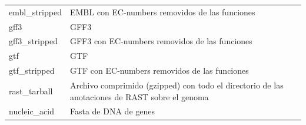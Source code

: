 \documentclass[12pt,twoside]{reedthesis}
\begin{document}
\begin{longtable}[]{@{}ll@{}}
\begin{minipage}[t]{0.22\columnwidth}
  embl\_stripped\strut
  \end{minipage} & \begin{minipage}[t]{0.72\columnwidth}\raggedright\strut
  EMBL con EC-numbers removidos de las funciones\strut
  \end{minipage}\tabularnewline
  \begin{minipage}[t]{0.22\columnwidth}\raggedright\strut
  gff3\strut
  \end{minipage} & \begin{minipage}[t]{0.72\columnwidth}\raggedright\strut
  GFF3\strut
  \end{minipage}\tabularnewline
  \begin{minipage}[t]{0.22\columnwidth}\raggedright\strut
  gff3\_stripped\strut
  \end{minipage} & \begin{minipage}[t]{0.72\columnwidth}\raggedright\strut
  GFF3 con EC-numbers removidos de las funciones\strut
  \end{minipage}\tabularnewline
  \begin{minipage}[t]{0.22\columnwidth}\raggedright\strut
  gtf\strut
  \end{minipage} & \begin{minipage}[t]{0.72\columnwidth}\raggedright\strut
  GTF\strut
  \end{minipage}\tabularnewline
  \begin{minipage}[t]{0.22\columnwidth}\raggedright\strut
  gtf\_stripped\strut
  \end{minipage} & \begin{minipage}[t]{0.72\columnwidth}\raggedright\strut
  GTF con EC-numbers removidos de las funciones\strut
  \end{minipage}\tabularnewline
  \begin{minipage}[t]{0.22\columnwidth}\raggedright\strut
  rast\_tarball\strut
  \end{minipage} & \begin{minipage}[t]{0.72\columnwidth}\raggedright\strut
  Archivo comprimido (gzipped) con todo el directorio de las anotaciones
  de RAST sobre el genoma\strut
  \end{minipage}\tabularnewline
  \begin{minipage}[t]{0.22\columnwidth}\raggedright\strut
  nucleic\_acid\strut
  \end{minipage} & \begin{minipage}[t]{0.72\columnwidth}\raggedright\strut
  Fasta de DNA de genes\strut
  \end{minipage}\tabularnewline

\end{longtable}
\end{document}
